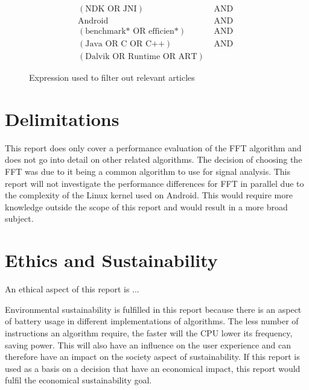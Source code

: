 \begin{figure}
    \centering
    \begin{align*}
        (\text{NDK OR JNI})               & \text{ AND } \\
        \text{Android}                    & \text{ AND } \\
        (\text{benchmark* OR efficien*})  & \text{ AND } \\
        (\text{Java OR C OR C++})         & \text{ AND } \\
        (\text{Dalvik OR Runtime OR ART}) &
    \end{align*}
    \caption{Expression used to filter out relevant articles}
    \label{fig:db:search}
\end{figure}


\section{Delimitations}
This report does only cover a performance evaluation of the FFT algorithm and does not go into detail on other related algorithms. The decision of choosing the FFT was due to it being a common algorithm to use for signal analysis. This report will not investigate the performance differences for FFT in parallel due to the complexity of the Linux kernel used on Android. This would require more knowledge outside the scope of this report and would result in a more broad subject.

\section{Ethics and Sustainability}
An ethical aspect of this report is ...

Environmental sustainability is fulfilled in this report because there is an aspect of battery usage in different implementations of algorithms. The less number of instructions an algorithm require, the faster will the CPU lower its frequency, saving power. This will also have an influence on the user experience and can therefore have an impact on the society aspect of sustainability. If this report is used as a basis on a decision that have an economical impact, this report would fulfil the economical sustainability goal.

